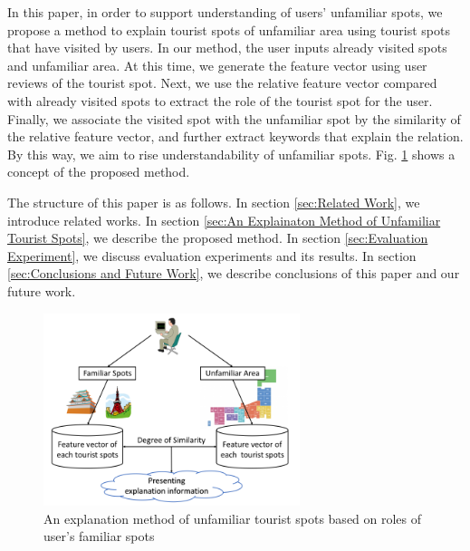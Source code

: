 \documentclass[journal]{IAENGtran}
\begin{document}
In this paper, in order to support understanding of users' unfamiliar spots, we propose a method to explain tourist spots of unfamiliar area using tourist spots that have visited by users.
In our method, the user inputs already visited spots and unfamiliar area.
At this time, we generate the feature vector using user reviews of the tourist spot.
Next, we use the relative feature vector compared with already visited spots to extract the role of the tourist spot for the user.
Finally, we associate the visited spot with the unfamiliar spot by the similarity of the relative feature vector, and further extract keywords that explain the relation.
By this way, we aim to rise understandability of unfamiliar spots.
Fig. \ref{fig:Photo_Image} shows a concept of the proposed method.

The structure of this paper is as follows.
In section \ref{sec:Related Work}, we introduce related works.
In section \ref{sec:An Explainaton Method of Unfamiliar Tourist Spots}, we describe the proposed method.
In section \ref{sec:Evaluation Experiment}, we discuss evaluation experiments and its results.
In section \ref{sec:Conclusions and Future Work}, we describe conclusions of this paper and our future work.

\begin{figure}[t]
  \begin{center}
    \includegraphics[clip,width=7.5cm,bb=0 0 720 540]{picture/Photo_Image_eng.png}
    \caption{An explanation method of unfamiliar tourist spots based on roles of user's familiar spots}
    \label{fig:Photo_Image}
   \end{center}
\end{figure}
\end{document}
